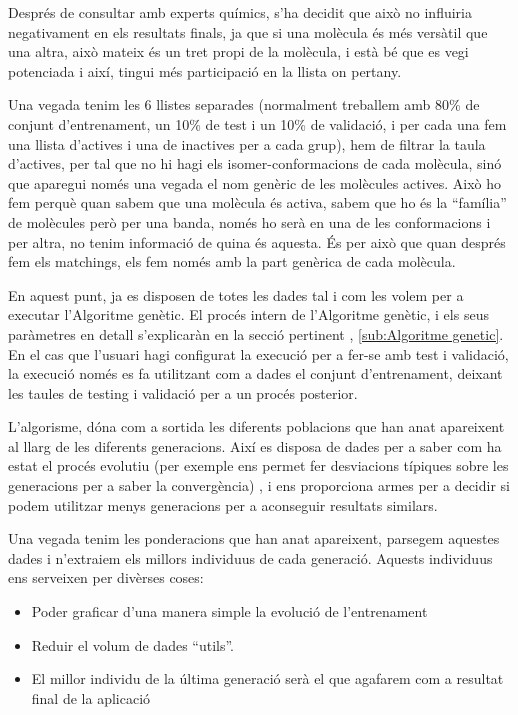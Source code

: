 \documentclass[titlepage,a4paper,12pt]{book}
\begin{document}
Després de consultar amb experts químics, s'ha decidit que això no influiria
negativament en els resultats finals, ja que si una molècula és més versàtil que
una altra, això mateix és un tret propi de la molècula, i està bé que es vegi
potenciada i així, tingui més participació en la llista on pertany.

Una vegada tenim les 6 llistes separades (normalment treballem amb 80\% de
conjunt d'entrenament, un 10\% de test i un 10\% de validació, i per cada una
fem una llista d'actives i una de inactives per a cada grup),  hem de filtrar la
taula d'actives, per tal que no hi hagi els  isomer-conformacions de cada
molècula, sinó que aparegui només una vegada el nom genèric de les molècules
actives.  Això ho fem perquè quan sabem que una molècula és activa, sabem que ho
és la ``família'' de molècules però per una banda, només ho serà en una de les
conformacions i per altra, no tenim informació de quina és aquesta.  És per això
que quan després fem els matchings, els fem només amb la part genèrica de cada
molècula.



En aquest punt, ja es disposen de totes les dades tal i com les volem per a
executar l'Algoritme genètic.  El procés intern de l'Algoritme genètic, i els
seus paràmetres en detall s'explicaràn en la secció pertinent ,
\ref{sub:Algoritme genetic}.  En el cas que l'usuari hagi configurat la execució
per a fer-se amb test i validació, la execució només es fa utilitzant com a
dades el conjunt d'entrenament, deixant les taules de testing i validació per a
un procés posterior.

L'algorisme, dóna com a sortida les diferents poblacions que han anat apareixent
al llarg de les diferents generacions.  Així es disposa de dades per a saber com
ha estat el procés evolutiu (per exemple ens permet fer desviacions típiques
sobre les generacions per a saber la convergència) , i ens proporciona armes per
a decidir si podem utilitzar menys generacions per a aconseguir resultats
similars.

Una vegada tenim les ponderacions que han anat apareixent, parsegem aquestes
dades i n'extraiem els millors individuus de cada generació.  Aquests individuus
ens serveixen per divèrses coses:

\begin{itemize}
	\item Poder graficar d'una manera simple la evolució de l'entrenament
	\item Reduir el volum de dades ``utils''.
	\item El millor individu de la última generació serà el que agafarem com a
	resultat final de la aplicació
\end{itemize}
\end{document}
